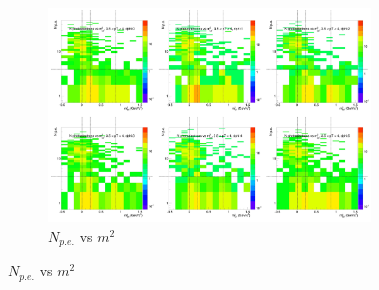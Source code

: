 \begin{figure}[H]
  \centering
    \begin{subfigure}{1\textwidth}
   \centering
   \includegraphics[width=0.94\textwidth]{hiptfits/neg/PSaccthreshold_cent0_ich0_accfire0_ptbin13.jpg}
    \caption{$N_{p.e.}$ vs $m^2$}
    \end{subfigure}
\end{figure}
